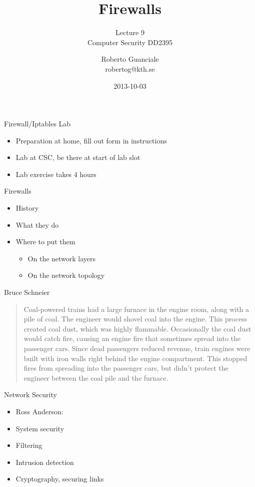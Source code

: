 \documentclass{beamer}
\title{Firewalls}
\subtitle{Lecture 9 \\ Computer Security DD2395}
\author[R. Guanciale]{
  Roberto Guanciale\\
  robertog@kth.se
}
\date{2013-10-03}
\begin{document}
\begin{frame}[plain]
  \titlepage
\end{frame}

\begin{frame}{Firewall/Iptables Lab}
  \begin{itemize}
  \item Preparation at home, fill out form in instructions 
  \item Lab at CSC, be there at start of lab slot 
  \item Lab exercise takes 4 hours
  \end{itemize}
\end{frame}

\begin{frame}{Firewalls}
  \begin{itemize}
  \item History 
  \item What they do 
  \item Where to put them 
    \begin{itemize}
    \item On the network layers 
    \item On the network topology
    \end{itemize}
  \end{itemize}
\end{frame}

\begin{frame}{Bruce Schneier}
  
  \begin{quote}
Coal-powered trains had a large furnace in the 
engine room, along with a pile of coal. The 
engineer would shovel coal into the engine. 
This process created coal dust, which was 
highly flammable. Occasionally the coal dust 
would catch fire, causing an engine fire that 
sometimes spread into the passenger cars. 
Since dead passengers reduced revenue, train 
engines were built with iron walls right behind 
the engine compartment. This stopped fires 
from spreading into the passenger cars, but 
didn't protect the engineer between the coal pile 
and the furnace.
  \end{quote}
\end{frame}

\begin{frame}{Network Security}
  \begin{itemize}
  \item Ross Anderson: 
  \item System security 
  \item Filtering 
  \item Intrusion detection 
  \item Cryptography, securing links 
  \end{itemize}
\end{frame}
\end{document}
